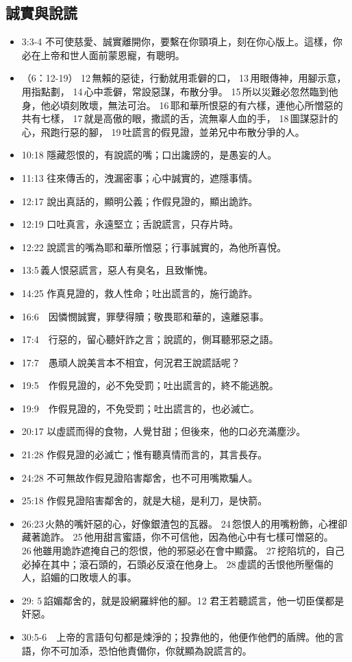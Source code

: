 \subsection{誠實與說謊}
\begin{itemize}
\itemsep-.45em 
\item 3:3-4 不可使慈愛、誠實離開你，要繫在你頸項上，刻在你心版上。這樣，你必在上帝和世人面前蒙恩寵，有聰明。
\item （6：12-19） 12 無賴的惡徒，行動就用乖僻的口， 13 用眼傳神，用腳示意，用指點劃， 14 心中乖僻，常設惡謀，布散分爭。 15 所以災難必忽然臨到他身，他必頃刻敗壞，無法可治。 16 耶和華所恨惡的有六樣，連他心所憎惡的共有七樣， 17 就是高傲的眼，撒謊的舌，流無辜人血的手， 18 圖謀惡計的心，飛跑行惡的腳， 19 吐謊言的假見證，並弟兄中布散分爭的人。
\item 10:18 隱藏怨恨的，有說謊的嘴；口出讒謗的，是愚妄的人。
\item 11:13 往來傳舌的，洩漏密事；心中誠實的，遮隱事情。
\item 12:17 說出真話的，顯明公義；作假見證的，顯出詭詐。
\item 12:19 口吐真言，永遠堅立；舌說謊言，只存片時。
\item 12:22 說謊言的嘴為耶和華所憎惡；行事誠實的，為他所喜悅。
\item 13:5 義人恨惡謊言，惡人有臭名，且致慚愧。
\item 14:25 作真見證的，救人性命；吐出謊言的，施行詭詐。
\item 16:6　因憐憫誠實，罪孽得贖；敬畏耶和華的，遠離惡事。
\item 17:4　行惡的，留心聽奸詐之言；說謊的，側耳聽邪惡之語。
\item 17:7　愚頑人說美言本不相宜，何況君王說謊話呢？
\item 19:5　作假見證的，必不免受罰；吐出謊言的，終不能逃脫。
\item 19:9　作假見證的，不免受罰；吐出謊言的，也必滅亡。
\item 20:17 以虛謊而得的食物，人覺甘甜；但後來，他的口必充滿塵沙。
\item 21:28 作假見證的必滅亡；惟有聽真情而言的，其言長存。
\item 24:28 不可無故作假見證陷害鄰舍，也不可用嘴欺騙人。
\item 25:18 作假見證陷害鄰舍的，就是大槌，是利刀，是快箭。
\item 26:23 火熱的嘴奸惡的心，好像銀渣包的瓦器。 24 怨恨人的用嘴粉飾，心裡卻藏著詭詐。 25 他用甜言蜜語，你不可信他，因為他心中有七樣可憎惡的。 26 他雖用詭詐遮掩自己的怨恨，他的邪惡必在會中顯露。 27 挖陷坑的，自己必掉在其中；滾石頭的，石頭必反滾在他身上。 28 虛謊的舌恨他所壓傷的人，諂媚的口敗壞人的事。
\item 29: 5 諂媚鄰舍的，就是設網羅絆他的腳。12 君王若聽謊言，他一切臣僕都是奸惡。
\item 30:5-6　上帝的言語句句都是煉淨的；投靠他的，他便作他們的盾牌。他的言語，你不可加添，恐怕他責備你，你就顯為說謊言的。
\end{itemize}


